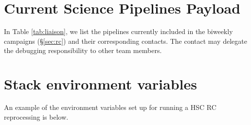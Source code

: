 \documentclass[DM,authoryear,toc]{lsstdoc}
\begin{document}
\appendix

\section{Current Science Pipelines Payload}

In Table \ref{tab:liaison}, we list the pipelines currently included
in the biweekly campaigns (\S \ref{sec:rc}) and their corresponding
contacts. The contact may delegate the debugging responsibility to
other team members.


\section{Stack environment variables}
An example of the environment variables set up for running a HSC RC reprocessing is below.



\end{document}
